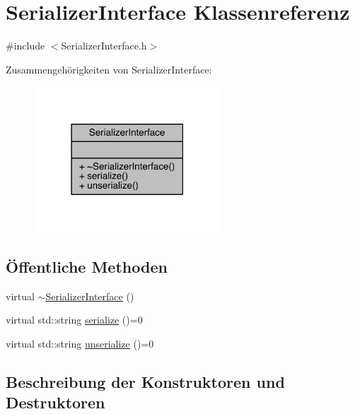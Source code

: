 \hypertarget{class_serializer_interface}{}\section{Serializer\+Interface Klassenreferenz}
\label{class_serializer_interface}


{\ttfamily \#include $<$Serializer\+Interface.\+h$>$}



Zusammengehörigkeiten von Serializer\+Interface\+:\nopagebreak
\begin{figure}[H]
\begin{center}
\leavevmode
\includegraphics[width=198pt]{class_serializer_interface__coll__graph}
\end{center}
\end{figure}
\subsection*{Öffentliche Methoden}
\begin{DoxyCompactItemize}
\item 
virtual \hyperlink{class_serializer_interface_aea8141688fdd8721b178c181d25820e2}{$\sim$\+Serializer\+Interface} ()
\item 
virtual std\+::string \hyperlink{class_serializer_interface_a7ca657af272daca5396afd0c53f845a5}{serialize} ()=0
\item 
virtual std\+::string \hyperlink{class_serializer_interface_a0d3718721a1b03be94e5b3efb09c9f7b}{unserialize} ()=0
\end{DoxyCompactItemize}


\subsection{Beschreibung der Konstruktoren und Destruktoren}
\hypertarget{class_serializer_interface_aea8141688fdd8721b178c181d25820e2}{}\label{class_serializer_interface_aea8141688fdd8721b178c181d25820e2} 
